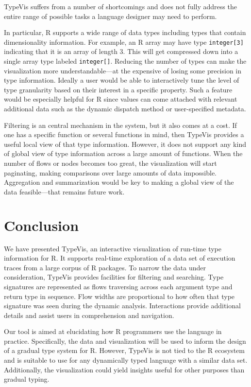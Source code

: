 \documentclass{vgtc}                          %
\newcommand{\typevis}{{\sc TypeVis}\xspace}
\begin{document}
\typevis suffers from a number of shortcomings
and does not fully address the entire range of possible tasks
a language designer may need to perform.

In particular, R supports a wide range of data types
including types that contain dimensionality information.
For example, an R array may have type {\tt integer[3]}
indicating that it is an array of length $3$.
This will get compressed down into a single array
type labeled {\tt integer[]}.
Reducing the number of types can make the visualization
more understandable---at the expensive of losing some
precision in type information.
Ideally a user would be able to interactively tune
the level of type granularity based on their interest
in a specific property.
Such a feature would be especially helpful for R
since values can come attached with relevant additional
data such as the dynamic dispatch method
or user-specified metadata.

Filtering is an central mechanism in the system,
but it also comes at a cost.
If one has a specific function or several functions
in mind, then \typevis provides a useful
local view of that type information.
However, it does not support any kind of global
view of type information across a large amount of
functions. When the number of flows or nodes
becomes too great, the visualization will start
paginating, making comparisons over large amounts
of data impossible.
Aggregation and summarization would be key to
making a global view of the data feasible---that
remains future work.


\section{Conclusion}

We have presented \typevis, an interactive visualization
of run-time type information for R.
It supports real-time exploration of a data set of
execution traces from a large corpus of R packages.
To narrow the data under consideration,
\typevis provides facilities for filtering
and searching.
Type signatures are represented as flows traversing across
each argument type and return type in sequence.
Flow widths are proportional to how often
that type signature was seen during the dynamic analysis.
Interactions provide additional details and
assist users in comprehension and navigation.

Our tool is aimed at elucidating how R programmers
use the language in practice.
Specifically, the data and visualization will be used to
inform the design of a gradual type system for R.
However, \typevis is not tied to the R ecosystem
and is suitable to use for any dynamically typed language
with a similar data set.
Additionally, the visualization could yield insights
useful for other purposes than gradual typing.
\end{document}
